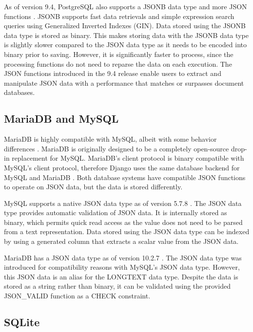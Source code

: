 As of version 9.4, PostgreSQL also supports a JSONB data type and more JSON
functions \cite{postgresql:9.4}. JSONB supports fast data retrievals and simple
expression search queries using Generalized Inverted Indexes (GIN). Data stored
using the JSONB data type is stored as binary. This makes storing data with the
JSONB data type is slightly slower compared to the JSON data type as it needs
to be encoded into binary prior to saving. However, it is significantly faster
to process, since the processing functions do not need to reparse the data on
each execution. The JSON functions introduced in the 9.4 release enable users
to extract and manipulate JSON data with a performance that matches or
surpasses document databases.

\subsection{MariaDB and MySQL}

MariaDB is highly compatible with MySQL, albeit with some behavior differences
\cite{mariadb:compatibility}. MariaDB is originally designed to be a completely
open-source drop-in replacement for MySQL. MariaDB's client protocol is binary
compatible with MySQL's client protocol, therefore Django uses the same
database backend for MySQL and MariaDB \cite{django:databases}. Both database
systems have compatible JSON functions to operate on JSON data, but the data
is stored differently.

MySQL supports a native JSON data type as of version 5.7.8 \cite{mysql:json}.
The JSON data type provides automatic validation of JSON data. It is internally
stored as binary, which permits quick read access as the value does not need to
be parsed from a text representation. Data stored using the JSON data type can
be indexed by using a generated column that extracts a scalar value from the
JSON data.

MariaDB has a JSON data type as of version 10.2.7 \cite{mariadb:json}. The JSON
data type was introduced for compatibility reasons with MySQL's JSON data type.
However, this JSON data is an alias for the LONGTEXT data type. Despite the
data is stored as a string rather than binary, it can be validated using the
provided JSON\_VALID function as a CHECK constraint.

\subsection{SQLite}

